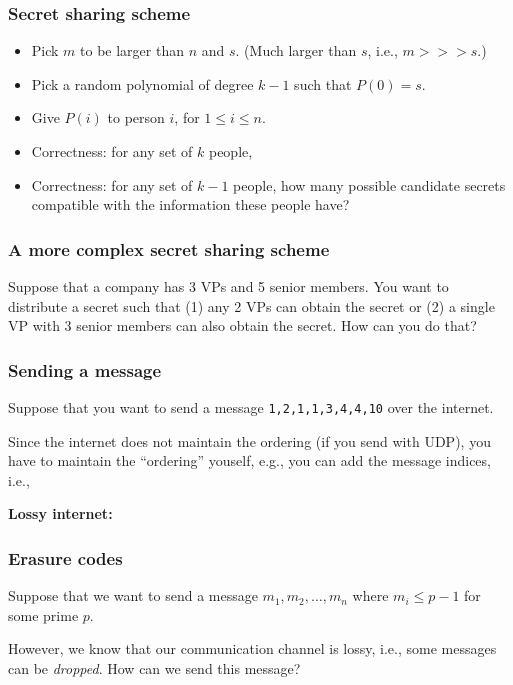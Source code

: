 \begin{frame}
  \frametitle{Secret sharing scheme}
  \pause
  \begin{itemize}
  \item Pick $m$ to be larger than $n$ and $s$. (Much larger than $s$,
    i.e., $m >>> s$.)
  \item Pick a random polynomial of degree $k-1$ such that $P(0)=s$.
  \item Give $P(i)$ to person $i$, for $1\leq i\leq n$.
  \item Correctness: for any set of $k$ people,
    \pause

  \item Correctness: for any set of $k-1$ people, how many possible
    candidate secrets compatible with the information these people
    have?
  \end{itemize}
\end{frame}

\begin{frame}
  \frametitle{A more complex secret sharing scheme}

  Suppose that a company has 3 VPs and 5 senior members.  You want to
  distribute a secret such that (1) any 2 VPs can obtain the secret or
  (2) a single VP with 3 senior members can also obtain the secret.
  How can you do that?
  
  \vspace{2.5in}
\end{frame}

\begin{frame}
  \frametitle{Sending a message}

  Suppose that you want to send a message {\tt 1,2,1,1,3,4,4,10} over
  the internet.

  \pause
  
  Since the internet does not maintain the ordering (if you send with
  UDP), you have to maintain the ``ordering'' youself, e.g., you can
  add the message indices, i.e.,
  \pause

  {\bf Lossy internet:}
  
  \vspace{1.5in}
\end{frame}

\begin{frame}
  \frametitle{Erasure codes}

  Suppose that we want to send a message $m_1,m_2,\ldots,m_n$ where
  $m_i\leq p-1$ for some prime $p$. 

  However, we know that our communication channel is lossy, i.e., some
  messages can be {\em dropped}.  How can we send this message?

  \vspace{2.5in}
\end{frame}

